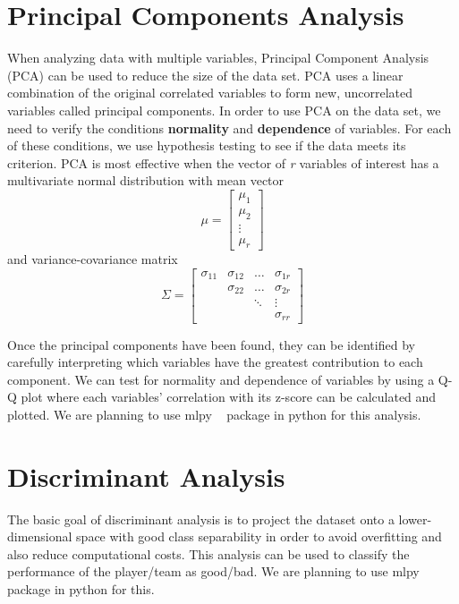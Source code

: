 \documentclass{acm_proc_article-sp}
\begin{document}
\vspace{12em}
\section{Principal Components Analysis}
When analyzing data with multiple variables, Principal Component Analysis (PCA) can be used to reduce the size of the data set. PCA uses a linear combination of the original correlated variables to form new, uncorrelated variables called principal components. In order to use PCA on the data set, we need to verify the conditions \textbf{normality} and \textbf{dependence} of variables. For each of these conditions, we use hypothesis testing to see if the data meets its criterion. PCA is most effective when the vector of \textit{r} variables of interest has a multivariate normal distribution with mean vector\\ 
\[
\mu=
\begin{bmatrix}
    \mu_{1} \\    
    \mu_{2} \\
    \vdots \\
    \mu_{r}
\end{bmatrix}
\]
and variance-covariance matrix 
\[
\Sigma =
\begin{bmatrix}
    \sigma_{11} & \sigma_{12} & \dots &  \sigma_{1r} \\
    & \sigma_{22} & \dots  & \sigma_{2r} \\
    & & \ddots & \vdots \\
    & & & \sigma_{rr} 
\end{bmatrix}
\]

Once the principal components have been found, they can be identified by carefully interpreting which variables have the greatest contribution to each component. We can test for normality and dependence of variables by using a Q-Q plot where each variables' correlation with its z-score can be calculated and plotted. We are planning to use mlpy  ~\cite{mlpy} package in python for this analysis.

\section{Discriminant Analysis}
The basic goal of discriminant analysis is to project the dataset onto a lower-dimensional space with good class separability in order to avoid overfitting and also reduce computational costs. This analysis can be used to classify the performance of the player/team as good/bad. We are planning to use mlpy  ~\cite{mlpy} package in python for this.
\end{document}
